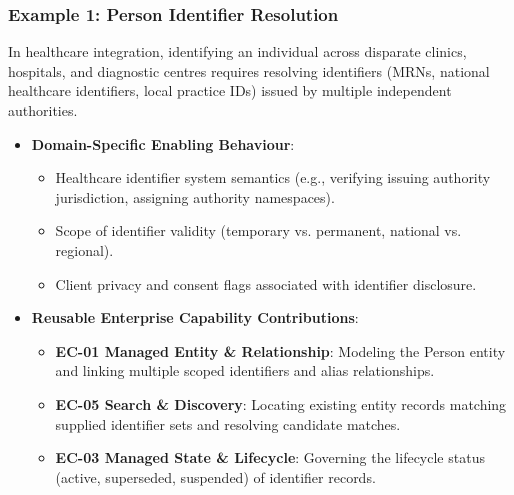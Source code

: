 \label{rad:tier-model:192}
\subsubsection*{Example 1: Person Identifier Resolution}
\label{rad:tier-model:194}

In healthcare integration, identifying an individual across disparate clinics, hospitals, and diagnostic centres requires resolving identifiers (MRNs, national healthcare identifiers, local practice IDs) issued by multiple independent authorities.

\label{rad:tier-model:196}

\begin{itemize}

\item 
\textbf{Domain-Specific Enabling Behaviour}:


\begin{itemize}

\item 
Healthcare identifier system semantics (e.g., verifying issuing authority jurisdiction, assigning authority namespaces).



\item 
Scope of identifier validity (temporary vs. permanent, national vs. regional).



\item 
Client privacy and consent flags associated with identifier disclosure.



\end{itemize}


\item 
\textbf{Reusable Enterprise Capability Contributions}:


\begin{itemize}

\item 
\textbf{EC-01 Managed Entity \& Relationship}: Modeling the Person entity and linking multiple scoped identifiers and alias relationships.



\item 
\textbf{EC-05 Search \& Discovery}: Locating existing entity records matching supplied identifier sets and resolving candidate matches.



\item 
\textbf{EC-03 Managed State \& Lifecycle}: Governing the lifecycle status (active, superseded, suspended) of identifier records.




\end{itemize}
\end{itemize}
